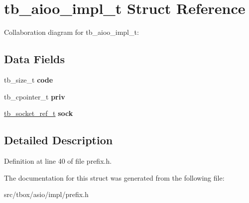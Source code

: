 \hypertarget{structtb__aioo__impl__t}{\section{tb\-\_\-aioo\-\_\-impl\-\_\-t Struct Reference}
\label{structtb__aioo__impl__t}
}


Collaboration diagram for tb\-\_\-aioo\-\_\-impl\-\_\-t\-:
\subsection*{Data Fields}
\begin{DoxyCompactItemize}
\item 
\hypertarget{structtb__aioo__impl__t_a580b2d7d7dee2295a4275c561872e871}{tb\-\_\-size\-\_\-t {\bfseries code}}\label{structtb__aioo__impl__t_a580b2d7d7dee2295a4275c561872e871}

\item 
\hypertarget{structtb__aioo__impl__t_afb19fd8bb91683598bcc0685018aee9e}{tb\-\_\-cpointer\-\_\-t {\bfseries priv}}\label{structtb__aioo__impl__t_afb19fd8bb91683598bcc0685018aee9e}

\item 
\hypertarget{structtb__aioo__impl__t_a3a7881a9dc60f142fab5b1994cc8d746}{\hyperlink{structtb__socket__ref__t}{tb\-\_\-socket\-\_\-ref\-\_\-t} {\bfseries sock}}\label{structtb__aioo__impl__t_a3a7881a9dc60f142fab5b1994cc8d746}

\end{DoxyCompactItemize}


\subsection{Detailed Description}


Definition at line 40 of file prefix.\-h.



The documentation for this struct was generated from the following file\-:\begin{DoxyCompactItemize}
\item 
src/tbox/asio/impl/prefix.\-h\end{DoxyCompactItemize}
